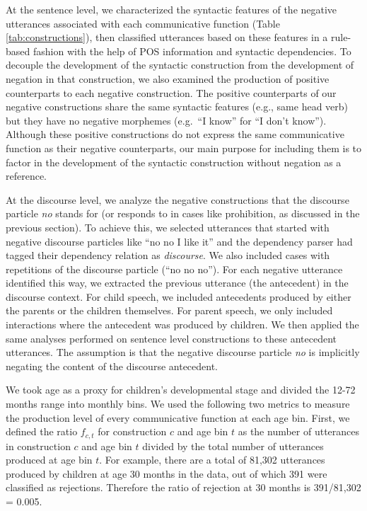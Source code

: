 \documentclass[
  man,floatsintext]{apa6}
\begin{document}
At the sentence level, we characterized the syntactic features of the negative utterances associated with each communicative function (Table \ref{tab:constructions}), then classified utterances based on these features in a rule-based fashion with the help of POS information and syntactic dependencies. To decouple the development of the syntactic construction from the development of negation in that construction, we also examined the production of positive counterparts to each negative construction. The positive counterparts of our negative constructions share the same syntactic features (e.g., same head verb) but they have no negative morphemes (e.g.~``I know'' for ``I don't know''). Although these positive constructions do not express the same communicative function as their negative counterparts, our main purpose for including them is to factor in the development of the syntactic construction without negation as a reference.

At the discourse level, we analyze the negative constructions that the discourse particle \emph{no} stands for (or responds to in cases like prohibition, as discussed in the previous section). To achieve this, we selected utterances that started with negative discourse particles like ``no no I like it'' and the dependency parser had tagged their dependency relation as \emph{discourse}. We also included cases with repetitions of the discourse particle (``no no no''). For each negative utterance identified this way, we extracted the previous utterance (the antecedent) in the discourse context. For child speech, we included antecedents produced by either the parents or the children themselves. For parent speech, we only included interactions where the antecedent was produced by children. We then applied the same analyses performed on sentence level constructions to these antecedent utterances. The assumption is that the negative discourse particle \emph{no} is implicitly negating the content of the discourse antecedent.

We took age as a proxy for children's developmental stage and divided the 12-72 months range into monthly bins. We used the following two metrics to measure the production level of every communicative function at each age bin. First, we defined the ratio \(f_{c,t}\) for construction \(c\) and age bin \(t\) as the number of utterances in construction \(c\) and age bin \(t\) divided by the total number of utterances produced at age bin \(t\). For example, there are a total of 81,302 utterances produced by children at age 30 months in the data, out of which 391 were classified as rejections. Therefore the ratio of rejection at 30 months is 391/81,302 = 0.005.
\end{document}
